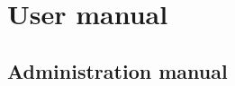 \chapter{User manual}\label{ch:manual}

\textellipsis

\section{Administration manual}\label{ch:adminmanual}
